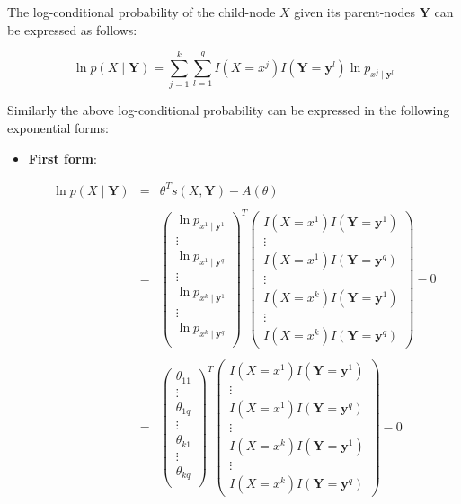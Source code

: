 \documentclass[11pt, oneside]{article}   	%
\numberwithin{figure}{section}
\numberwithin{equation}{section}
\numberwithin{table}{section}
\theoremstyle{definition}
\begin{document}
\begin{appendices}
The log-conditional probability of the child-node $X$ given its parent-nodes $\mathbf{Y}$ can be expressed as follows:

$$ \ln p(X \mid \mathbf{Y}) = \sum_{j=1}^k \sum_{l=1}^q I(X=x^j) I(\mathbf{Y} =\mathbf{y}^l) \ln p_{x^j  \mid \mathbf{y}^l} $$

Similarly the above log-conditional probability can be expressed in the following exponential forms:

\begin{itemize}

\item \textbf{First form}:

\begin{eqnarray*}
\ln p(X \mid \mathbf{Y}) &=& \theta^T s(X,\mathbf{Y}) - A(\theta) \\\\
&=&
\begin{pmatrix}
\ln p_{x^1\mid \mathbf{y}^1}\\
\vdots \\
\ln p_{x^1\mid \mathbf{y}^q}\\
\vdots \\
\ln p_{x^k\mid \mathbf{y}^1}\\
\vdots \\
\ln p_{x^k\mid \mathbf{y}^q}\\
\end{pmatrix}^T
\begin{pmatrix}
I(X=x^1)I(\mathbf{Y}=\mathbf{y}^1) \\
\vdots \\
I(X=x^1)I(\mathbf{Y}=\mathbf{y}^q)\\
\vdots \\
I(X=x^k)I(\mathbf{Y}=\mathbf{y}^1) \\
\vdots \\
I(X=x^k)I(\mathbf{Y}=\mathbf{y}^q)
\end{pmatrix}
- 0 \\\\
&=&
\begin{pmatrix}
\theta_{11}\\
\vdots \\
\theta_{1q}\\
\vdots \\
\theta_{k1}\\
\vdots \\
\theta_{kq}\\
\end{pmatrix}^T
\begin{pmatrix}
I(X=x^1) I(\mathbf{Y}=\mathbf{y}^1) \\
\vdots \\
I(X=x^1) I(\mathbf{Y}=\mathbf{y}^q)\\
\vdots \\
I(X=x^k) I(\mathbf{Y}=\mathbf{y}^1) \\
\vdots \\
I(X=x^k) I(\mathbf{Y}=\mathbf{y}^q)
\end{pmatrix}
- 0
\end{eqnarray*}


\end{itemize}
\end{appendices}
\end{document}
